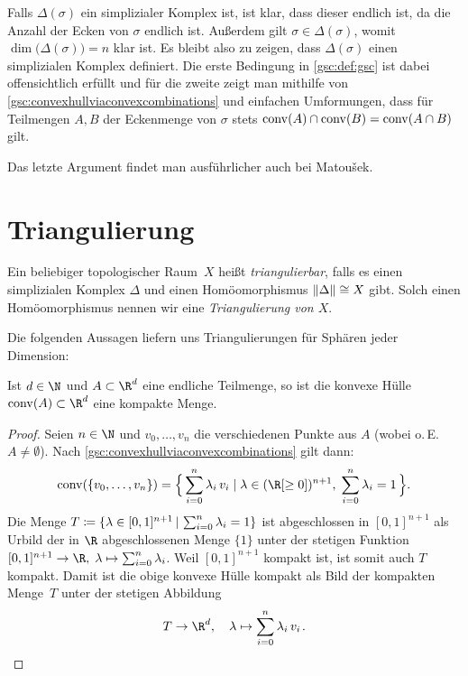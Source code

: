 \begin{proofsketch}
    Falls $\Delta(\sigma)$ ein simplizialer Komplex ist, ist klar, dass dieser
    endlich ist, da die Anzahl der Ecken von $\sigma$ endlich ist. Außerdem gilt
    $\sigma\in\Delta(\sigma)$, womit $\dim\bigl(\Delta(\sigma)\bigr) = n$ klar
    ist. Es bleibt also zu zeigen, dass $\Delta(\sigma)$ einen simplizialen
    Komplex definiert. Die erste Bedingung in \cref{gsc:def:gsc} ist dabei
    offensichtlich erfüllt und für die zweite zeigt man mithilfe von
    \cref{gsc:convexhullviaconvexcombinations} und einfachen Umformungen, dass
    für Teilmengen $A,B$ der Eckenmenge von $\sigma$ stets $\operatorname{conv}(A)\cap\operatorname{conv}(B)
    = \operatorname{conv}(A\cap B)$ gilt.
    \\
\end{proofsketch}

Das letzte Argument findet man ausführlicher auch bei 
Matou\v sek\cite[Ch.\,1,.6]{bookc:matousek03}.


\section{Triangulierung}
\begin{thDef}
    Ein beliebiger topologischer Raum~$X$ heißt \emph{triangulierbar}, falls es
    einen simplizialen Komplex $\Delta$ und einen Homöomorphismus
    $\lVert\Delta\rVert \cong X$ gibt. Solch einen Homöomorphismus nennen wir 
    eine \emph{Triangulierung von $X$}.
\end{thDef}

Die folgenden Aussagen liefern uns Triangulierungen für Sphären jeder
Dimension:

\begin{thLemma}
    \label{gsc:convexhullcompact}
    Ist $d\in\N$ und $A\subset\R^d$ eine endliche Teilmenge, so ist die konvexe
    Hülle $\conv(A)\subset\R^d$ eine kompakte Menge.
\end{thLemma}

\begin{proof}
    Seien $n\in\N$ und $v_0,\ldots,v_n$ die verschiedenen Punkte aus $A$
    (wobei o.\,E. $A\neq\emptyset$).
    Nach \cref{gsc:convexhullviaconvexcombinations} gilt dann:
    \[ \conv(\{v_0,\ldots,v_n\}) = 
        \Bigl\{\, \isum^n \lambda_i\,v_i \Mid[\;] \lambda\in(\R[\geq0])^{n+1},
        \; \isum^n \lambda_i = 1    \,\Bigr\}
    . \]
    Die Menge 
    $T\defeq\{ \lambda\in [0,1]^{n+1} \Mid \isum^n \lambda_i = 1 \}$
    ist abgeschlossen in $[0,1]^{n+1}$ als Urbild der in $\R$ abgeschlossenen
    Menge $\{1\}$ unter der stetigen Funktion $[0,1]^{n+1}\to\R,\;
    \lambda\mapsto\isum^n \lambda_i$. Weil $[0,1]^{n+1}$ kompakt ist, ist somit
    auch $T$ kompakt. Damit ist die obige konvexe Hülle kompakt als Bild der
    kompakten Menge~$T$ unter der stetigen Abbildung
    \[ T \to \R^d, \quad \lambda\mapsto \isum^n \lambda_i\,v_i \mkern2mu . \]
\end{proof}

